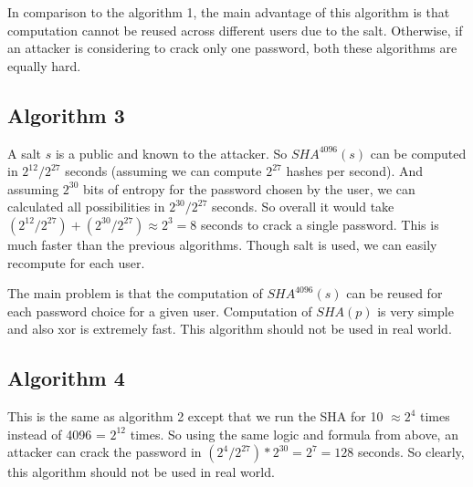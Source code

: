 \documentclass{article}
\begin{document}
    In comparison to the algorithm 1, the main advantage of this algorithm is that computation cannot be reused across different users due to the salt. Otherwise, if an attacker is considering to crack only one password, both these algorithms are equally hard.

    \subsection*{Algorithm 3}
    A salt $s$ is a public and known to the attacker. So $SHA^{4096}(s)$ can be computed in $2^{12} / 2^{27}$ seconds (assuming we can compute $2^{27}$ hashes per second). And assuming $2^{30}$ bits of entropy for the password chosen by the user, we can calculated all possibilities in $2^{30} / 2^{27}$ seconds. So overall it would take $(2^{12} / 2^{27}) + (2^{30} / 2^{27}) \approx 2^3 = 8$ seconds to crack a single password. This is much faster than the previous algorithms. Though salt is used, we can easily recompute for each user.
    
    The main problem is that the computation of $SHA^{4096}(s)$ can be reused for each password choice for a given user. Computation of $SHA(p)$ is very simple and also xor is extremely fast. This algorithm should not be used in real world.

    \subsection*{Algorithm 4}
    This is the same as algorithm 2 except that we run the SHA for 10 $\approx 2^4$ times instead of 4096 = $2^{12}$ times. So using the same logic and formula from above, an attacker can crack the password in $(2^4 / 2^{27}) * 2^{30} = 2^7 = 128$ seconds. So clearly, this algorithm should not be used in real world.
\end{document}
